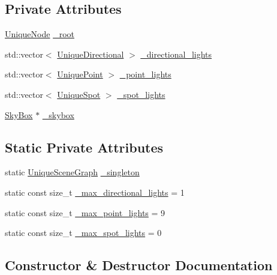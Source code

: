 \subsection*{Private Attributes}
\begin{DoxyCompactItemize}
\item 
\hyperlink{namespaceLarp_ad95a88bc34f8c78cefd64c9bbeb94a58}{Unique\+Node} \hyperlink{classLarp_1_1SceneGraph_a88a58f51a6937827ae1d814d0b44a0d7}{\+\_\+root}
\item 
std\+::vector$<$ \hyperlink{namespaceLarp_af87ce889468b60d51aa1479335ba19bf}{Unique\+Directional} $>$ \hyperlink{classLarp_1_1SceneGraph_adda3dc8da15f0923afd44ff73e47a21c}{\+\_\+directional\+\_\+lights}
\item 
std\+::vector$<$ \hyperlink{namespaceLarp_acd7cacff15535544525abc2e90e07b91}{Unique\+Point} $>$ \hyperlink{classLarp_1_1SceneGraph_a1b72e08d2d1edbf959b9fcad65a8241d}{\+\_\+point\+\_\+lights}
\item 
std\+::vector$<$ \hyperlink{namespaceLarp_a288b58c470c3ed41d3b23e764ba5b6eb}{Unique\+Spot} $>$ \hyperlink{classLarp_1_1SceneGraph_a7abcb3d4cfaa7b4d92d30cbbeeeb275f}{\+\_\+spot\+\_\+lights}
\item 
\hyperlink{classLarp_1_1SkyBox}{Sky\+Box} $\ast$ \hyperlink{classLarp_1_1SceneGraph_a5821f205cc6238c6855a08e1016ac768}{\+\_\+skybox}
\end{DoxyCompactItemize}
\subsection*{Static Private Attributes}
\begin{DoxyCompactItemize}
\item 
static \hyperlink{namespaceLarp_a81a0d129ec1fc8f1f9fa231fbba6b19b}{Unique\+Scene\+Graph} \hyperlink{classLarp_1_1SceneGraph_a93181088bdc8610fb5d56904b588426f}{\+\_\+singleton}
\item 
static const size\+\_\+t \hyperlink{classLarp_1_1SceneGraph_aabaeceb65dc86a8f0b84c4a1a099e3d7}{\+\_\+max\+\_\+directional\+\_\+lights} = 1
\item 
static const size\+\_\+t \hyperlink{classLarp_1_1SceneGraph_a1bf0c7f3098c5edfe843d310a4c88f70}{\+\_\+max\+\_\+point\+\_\+lights} = 9
\item 
static const size\+\_\+t \hyperlink{classLarp_1_1SceneGraph_a3f308c89413969e78b25014dcaedab1f}{\+\_\+max\+\_\+spot\+\_\+lights} = 0
\end{DoxyCompactItemize}


\subsection{Constructor \& Destructor Documentation}
